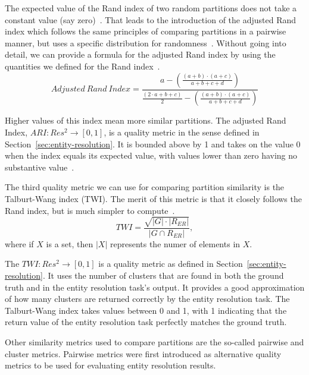 The expected value of the Rand index of two random partitions does not take
a constant value (say zero)~\cite{adjrand2001}.
That leads to the introduction of the adjusted Rand index which follows the
same principles of comparing partitions in a pairwise manner, but uses a
specific distribution for randomness~\cite{adjrand1985}.
Without going into detail, we can provide a formula for the adjusted Rand
index by using the quantities we defined for the Rand index~\cite{Tal11}.
\[
    Adjusted~Rand~Index = \frac{
        a -\left(\frac{(a+b)\cdot(a+c)}{a+b+c+d}\right)
    }{
        \frac{(2\cdot a+b+c)}{2}-\left(\frac{(a+b)\cdot(a+c)}{a+b+c+d}\right)
    }
\]

Higher values of this index mean more similar partitions.
The adjusted Rand Index, $ARI : Res^2 \rightarrow \left[0, 1\right]$, is a
quality metric in the sense defined in Section~\ref{sec:entity-resolution}.
It is bounded above by 1 and takes on the value 0 when the index equals its
expected value, with values lower than zero having no substantive
value~\cite{adjrand1985}.

The third quality metric we can use for comparing partition similarity is
the Talburt-Wang index (TWI).
The merit of this metric is that it closely follows the Rand index, but is
much simpler to compute~\cite{Tal11}.
\[
    TWI = \frac{\sqrt{|G|\cdot|R_{ER}|}}{|G \cap R_{ER}|},
\]
where if $X$ is a set, then $|X|$ represents the numer of elements in $X$. 

The $TWI: Res^2 \rightarrow \left[0, 1\right]$ is a quality metric as defined in
Section~\ref{sec:entity-resolution}.
It uses the number of clusters that are found in both the ground truth and in
the entity resolution task's output.
It provides a good approximation of how many clusters are returned correctly
by the entity resolution task.
The Talburt-Wang index takes values between 0 and 1, with 1 indicating that
the return value of the entity resolution task perfectly matches the ground
truth.

Other similarity metrics used to compare partitions are the so-called pairwise
and cluster metrics.
Pairwise metrics were first introduced as alternative quality metrics to be used
for evaluating entity resolution results\cite{Men10}.

